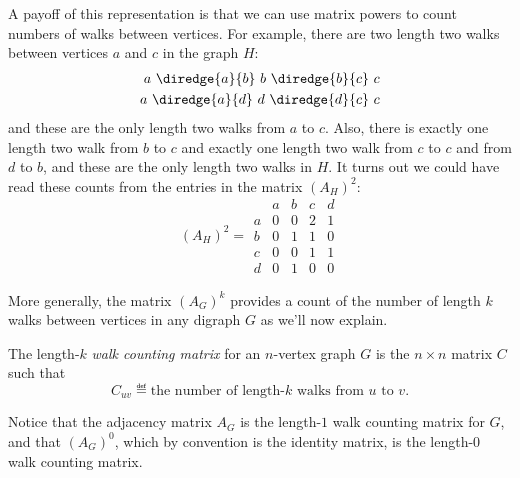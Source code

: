 A payoff of this representation is that we can use matrix powers to
count numbers of walks between vertices.  For example, there are two
length two walks between vertices $a$ and $c$ in the graph $H$:
\begin{align*}
a\ \diredge{a}{b}\ b\ \diredge{b}{c}\  c\\
a\ \diredge{a}{d}\ d\ \diredge{d}{c}\ c
\end{align*}
and these are the only length two walks from $a$ to $c$.  Also, there is
exactly one length two walk from $b$ to $c$ and exactly one length two
walk from $c$ to $c$ and from $d$ to $b$, and these are the only
length two walks in $H$.  It turns out we could have read these counts
from the entries in the matrix $(A_H)^2$:
\[
(A_H)^2 = \begin{array}{c|cccc|}
  &  a & b & c & d \\ \hline
a &  0 & 0 & 2 & 1 \\
b &  0 & 1 & 1 & 0 \\
c &  0 & 0 & 1 & 1 \\
d &  0 & 1 & 0 & 0
\end{array}
\]

\iffalse
If $G$ is a weighted graph with edge weights given by $w: E \to
\reals$, then the adjacency matrix for~$G$ is $A_G = \{ a_{ij} \}$
where
\begin{equation*}
    a_{ij} = \begin{cases}
                w(\edge{v_i}{v_j}) & \text{if $\edge{v_i}{v_j} \in E$} \\
                0                 & \text{otherwise.}
              \end{cases}
\end{equation*}
\end{definition}

For example, Figure~\ref{fig:adjacency_matrix} displays the adjacency
matrices for the graphs shown in Figures~\ref{fig:isomorphism}(a)
and~\ref{fig:weighted_graph} where $v_1 = a$, $v_2 = b$, $v_3 = c$,
and $v_4 = d$.
\fi

More generally, the matrix $(A_G)^k$ provides a count of the number of
length $k$ walks between vertices in any digraph $G$ as we'll now
explain.

\begin{definition}
  The length-$k$ \emph{walk counting matrix}%
%
for an $n$-vertex graph $G$ is the $n \times n$ matrix $C$ such that
\begin{equation}\label{def:walk_matrix}
C_{uv} \eqdef \text{the number of length-$k$ walks from $u$ to $v$}.
\end{equation}
\end{definition}
Notice that the adjacency matrix $A_G$ is the length-$1$ walk counting
matrix for $G$, and that $(A_G)^0$, which by convention is the identity
matrix, is the length-0 walk counting matrix.

